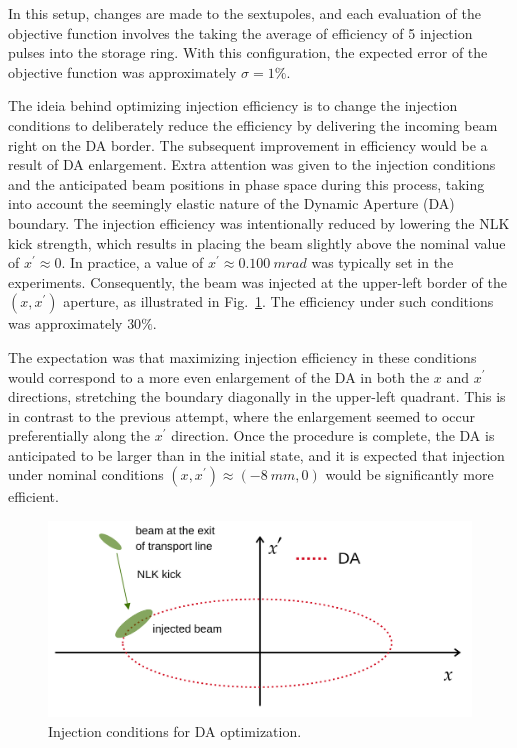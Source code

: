 In this setup, changes are made to the sextupoles, and each evaluation of the objective function involves the taking the average of efficiency of 5 injection pulses into the storage ring. With this configuration, the expected error of the objective function was approximately $\sigma=1\%$.

The ideia behind optimizing injection efficiency is to change the injection conditions to deliberately reduce the efficiency by delivering the incoming beam right on the DA border. The subsequent improvement in efficiency would be a result of DA enlargement. Extra attention was given to the injection conditions and the anticipated beam positions in phase space during this process, taking into account the seemingly elastic nature of the Dynamic Aperture (DA) boundary. The injection efficiency was intentionally reduced by lowering the NLK kick strength, which results in placing the beam slightly above the nominal value of $x^\prime\approx 0$. In practice, a value of $x^\prime\approx 0.100~\unit{mrad}$ was typically set in the experiments. Consequently, the beam was injected at the upper-left border of the $(x,x^\prime)$ aperture, as illustrated in Fig.~\ref{fig:inj_cond}. The efficiency under such conditions was approximately $30\%$.

The expectation was that maximizing injection efficiency in these conditions would correspond to a more even enlargement of the DA in both the $x$ and $x^{\prime}$ directions, stretching the boundary diagonally in the upper-left quadrant. This is in contrast to the previous attempt, where the enlargement seemed to occur preferentially along the $x^\prime$ direction. Once the procedure is complete, the DA is anticipated to be larger than in the initial state, and it is expected that injection under nominal conditions $(x, x^\prime)\approx(-8~\unit{mm}, 0)$ would be significantly more efficient.
\begin{figure}[tb]
    \centering
    \includegraphics[width=0.7\columnwidth]{Images/inj_cond.png}
    \caption[Injection conditions for DA optimization.]{Injection conditions for DA optimization.}
    \label{fig:inj_cond}
\end{figure}

